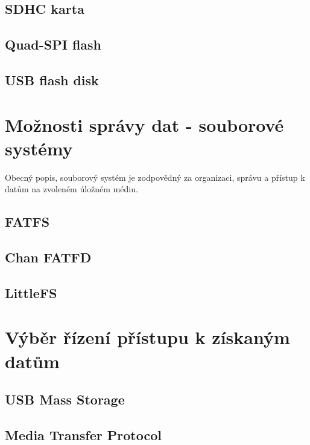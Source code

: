 \subsection{SDHC karta}

\subsection{Quad-SPI flash}

\subsection{USB flash disk}

\section{Možnosti správy dat - souborové systémy} 
Obecný popis, souborový systém je zodpovědný za organizaci, správu a přístup k datům na zvoleném úložném médiu.

\subsection{FATFS}

\subsection{Chan FATFD}

\subsection{LittleFS}



\section{Výběr řízení přístupu k získaným datům}

\subsection{USB Mass Storage}

\subsection{Media Transfer Protocol}

